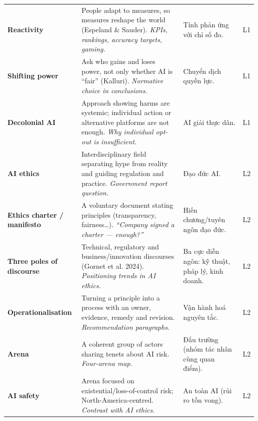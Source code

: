 \documentclass[11pt,a4paper]{article}
\begin{document}
{\begin{longtable}{>{\RaggedRight\arraybackslash\bfseries}p{3.3cm}>{\RaggedRight\arraybackslash}p{5.1cm}>{\RaggedRight\arraybackslash}p{5.1cm}>{\centering\arraybackslash}p{0.8cm}}
Reactivity & People adapt to measures, so measures reshape the world (Espeland \& Sauder). \newline\textit{\color{teal}KPIs, rankings, accuracy targets, gaming.} & \textcolor{tipc}{Tính phản ứng với chỉ số đo.} & L1\\[3pt]
Shifting power & Ask who gains and loses power, not only whether AI is “fair” (Kalluri). \newline\textit{\color{teal}Normative choice in conclusions.} & \textcolor{tipc}{Chuyển dịch quyền lực.} & L1\\[3pt]
Decolonial AI & Approach showing harms are systemic; individual action or alternative platforms are not enough. \newline\textit{\color{teal}Why individual opt-out is insufficient.} & \textcolor{tipc}{AI giải thực dân.} & L1\\[3pt]
AI ethics & Interdisciplinary field separating hype from reality and guiding regulation and practice. \newline\textit{\color{teal}Government report question.} & \textcolor{tipc}{Đạo đức AI.} & L2\\[3pt]
Ethics charter / manifesto & A voluntary document stating principles (transparency, fairness…). \newline\textit{\color{teal}“Company signed a charter — enough?”} & \textcolor{tipc}{Hiến chương/tuyên ngôn đạo đức.} & L2\\[3pt]
Three poles of discourse & Technical, regulatory and business/innovation discourses (Gornet et al. 2024). \newline\textit{\color{teal}Positioning trends in AI ethics.} & \textcolor{tipc}{Ba cực diễn ngôn: kỹ thuật, pháp lý, kinh doanh.} & L2\\[3pt]
Operationalisation & Turning a principle into a process with an owner, evidence, remedy and revision. \newline\textit{\color{teal}Recommendation paragraphs.} & \textcolor{tipc}{Vận hành hoá nguyên tắc.} & L2\\[3pt]
Arena & A coherent group of actors sharing tenets about AI risk. \newline\textit{\color{teal}Four-arena map.} & \textcolor{tipc}{Đấu trường (nhóm tác nhân cùng quan điểm).} & L2\\[3pt]
AI safety & Arena focused on existential/loss-of-control risk; North-America-centred. \newline\textit{\color{teal}Contrast with AI ethics.} & \textcolor{tipc}{An toàn AI (rủi ro tồn vong).} & L2\\[3pt]

\end{longtable}}
\end{document}
